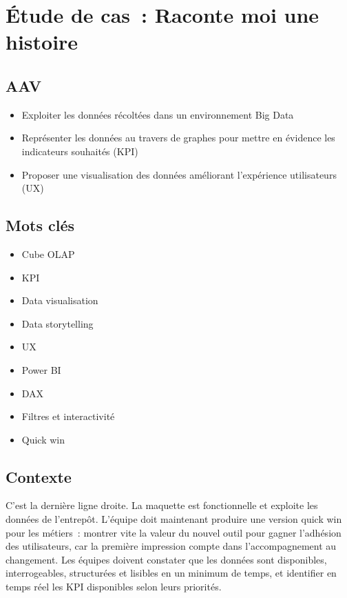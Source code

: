 \newpage
\section*{Étude de cas~: Raconte moi une histoire}
{}

\subsection*{AAV}
{}
\begin{itemize}
	\item [3] Exploiter les données récoltées dans un environnement Big Data
	\item [4] Représenter les données au travers de graphes pour mettre en évidence les indicateurs souhaités (KPI)
	\item [4] Proposer une visualisation des données améliorant l'expérience utilisateurs (UX)
\end{itemize}

\subsection*{Mots clés}
{}
\begin{itemize}
	\item Cube OLAP
	\item KPI
	\item Data visualisation
	\item Data storytelling
	\item UX
	\item Power BI
	\item DAX
	\item Filtres et interactivité
	\item Quick win
\end{itemize}

\subsection*{Contexte}
{}
\noindent C'est la dernière ligne droite. La maquette est fonctionnelle et exploite les données de l'entrepôt. L'équipe doit maintenant produire une version \og quick win\fg{} pour les métiers~: montrer vite la valeur du nouvel outil pour gagner l'adhésion des utilisateurs, car la première impression compte dans l'accompagnement au changement. Les équipes doivent constater que les données sont disponibles, interrogeables, structurées et lisibles en un minimum de temps, et identifier en temps réel les KPI disponibles selon leurs priorités.

